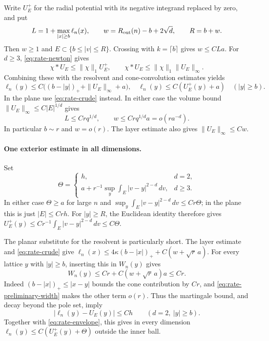 Write $U_E^+$ for the radial potential with its negative integrand
replaced by zero, and put
\[
 L=1+\max_{|x|\ge b}\ell_n(x),\qquad
 w=R_{\rm out}(n)-b+2\sqrt d,\qquad R=b+w.
\]
Then $w\ge1$ and $E\subset\{b\le|v|\le R\}$.
Crossing with $k=\lceil b\rceil$ gives $w\le CLa$.
For $d\ge3$, \eqref{eq:rate-newton} gives
\[
 \chi*U_E\le\|\chi\|_1U_E^+,\qquad
 \chi*U_E\le\|\chi\|_1\|U_E\|_\infty.
\]
Combining these with the resolvent and cone-convolution estimates yields
\begin{equation}\label{eq:rate-envelope}
 \ell_n(y)\le C\bigl((b-|y|)_++\|U_E\|_\infty+a\bigr),
 \quad
 \ell_n(y)\le C(U_E^+(y)+a)\quad(|y|\ge b).
\end{equation}
In the plane use \eqref{eq:rate-crude} instead. In either case the
volume bound $\|U_E\|_\infty\le C|E|^{1/d}$ gives
\begin{equation}\label{eq:rate-preliminary-width}
 L\le Crq^{1/d},\qquad w\le Crq^{1/d}a=o(r a^{-d}).
\end{equation}
In particular $b\sim r$ and $w=o(r)$. The layer estimate also gives
$\|U_E\|_\infty\le Cw$.

\paragraph{One exterior estimate in all dimensions.}
Set
\begin{equation}\label{eq:rate-theta}
 \Theta=\begin{cases}
 h,&d=2,\\
 a+r^{-1}\displaystyle\sup_y\int_E|v-y|^{2-d}\,dv,&d\ge3.
 \end{cases}
\end{equation}
In either case $\Theta\ge a$ for large $n$ and
$\sup_y\int_E|v-y|^{2-d}\,dv\le Cr\Theta$; in the plane this is
just $|E|\le Crh$. For $|y|\ge R$, the Euclidean identity therefore gives
$U_E^+(y)\le Cr^{-1}\int_E|v-y|^{2-d}\,dv\le C\Theta$.

The planar substitute for the resolvent is particularly short.
The layer estimate and \eqref{eq:rate-crude} give
$\ell_n(x)\le4\kappa(b-|x|)_++C(w+\sqrt r\,a)$.
For every lattice $y$ with $|y|\ge b$, inserting this in $W_n(y)$ gives
\[
 W_n(y)\le Cr+C(w+\sqrt r\,a)a\le Cr.
\]
Indeed $(b-|x|)_+\le|x-y|$ bounds the cone contribution by $Cr$,
and \eqref{eq:rate-preliminary-width} makes the other term $o(r)$.
Thus the martingale bound, and decay beyond the pole set, imply
\begin{equation}\label{eq:rate-planar-exterior}
 |\ell_n(y)-U_E(y)|\le Ch\qquad(d=2,\ |y|\ge b).
\end{equation}
Together with \eqref{eq:rate-envelope}, this gives in every dimension
$\ell_n(y)\le C(U_E^+(y)+\Theta)$ outside the inner ball.


